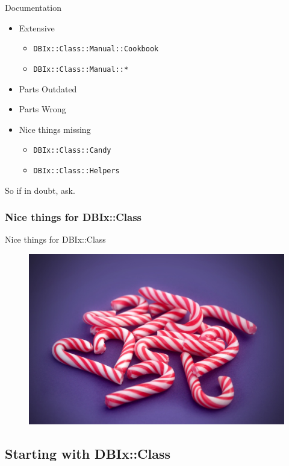 \begin{frame}[fragile]{Documentation}
\begin{itemize}
\item Extensive
\begin{itemize}
\item \verb|DBIx::Class::Manual::Cookbook|
\item \verb|DBIx::Class::Manual::*|
\end{itemize}
\item Parts Outdated
\item Parts Wrong
\item Nice things missing
\begin{itemize}
\item \verb|DBIx::Class::Candy|
\item \verb|DBIx::Class::Helpers|
\end{itemize}
\end{itemize}

So if in doubt,  ask.
\end{frame}

\subsubsection{Nice things for DBIx::Class}

\begin{frame}{Nice things for DBIx::Class}
\begin{figure}[!ht]
\centering
\includegraphics[width=0.8\linewidth]{img/candy-cane.jpg}
\end{figure}
\end{frame}

\subsection{Starting with DBIx::Class}


